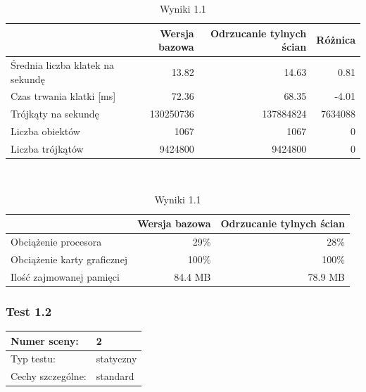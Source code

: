 \documentclass[a4paper,twoside,12pt]{book}
\begin{document}
\begin{table}[H]
    \centering
    \caption{Wyniki 1.1}
    \label{tab:backface_test1}
    \begin{tabular}{|l||r|r|r|}
        \hline
        & Wersja bazowa & Odrzucanie tylnych ścian & Różnica \\
        \hline
        Średnia liczba klatek na sekundę & 13.82 & 14.63 & 0.81 \\
        \hline
        Czas trwania klatki [ms] & 72.36 & 68.35 & -4.01 \\
        \hline
        Trójkąty na sekundę & 130250736 & 137884824 & 7634088 \\
        \hline
        Liczba obiektów & 1067 & 1067 & 0 \\
        \hline
        Liczba trójkątów & 9424800 & 9424800 & 0 \\
        \hline
    \end{tabular} \\
    
    \vspace*{0.5 cm}
    
    \begin{tabular}{|l||r|r|}
        \hline
        & Wersja bazowa & Odrzucanie tylnych ścian \\
         \hline
        Obciążenie procesora & 29\% & 28\% \\
        \hline
        Obciążenie karty graficznej & 100\% & 100\% \\
        \hline
        Ilość zajmowanej pamięci & 84.4 MB & 78.9 MB \\
        \hline
    \end{tabular}
\end{table}

\subsubsection{Test 1.2}
\begin{tabular}{|l||l|}
\hline
Numer sceny: & 2 \\
\hline
Typ testu: & statyczny \\
\hline
Cechy szczególne: & standard \\
\hline
\end{tabular}\\

\vbox{}
\end{document}
